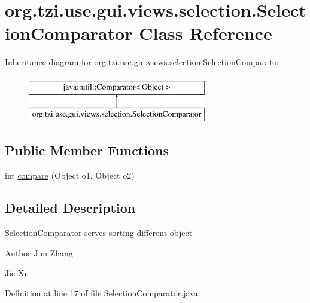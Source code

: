 \hypertarget{classorg_1_1tzi_1_1use_1_1gui_1_1views_1_1selection_1_1_selection_comparator}{\section{org.\-tzi.\-use.\-gui.\-views.\-selection.\-Selection\-Comparator Class Reference}
\label{classorg_1_1tzi_1_1use_1_1gui_1_1views_1_1selection_1_1_selection_comparator}
}
Inheritance diagram for org.\-tzi.\-use.\-gui.\-views.\-selection.\-Selection\-Comparator\-:\begin{figure}[H]
\begin{center}
\leavevmode
\includegraphics[height=2.000000cm]{classorg_1_1tzi_1_1use_1_1gui_1_1views_1_1selection_1_1_selection_comparator}
\end{center}
\end{figure}
\subsection*{Public Member Functions}
\begin{DoxyCompactItemize}
\item 
int \hyperlink{classorg_1_1tzi_1_1use_1_1gui_1_1views_1_1selection_1_1_selection_comparator_ae861cc638bd95613b9477306586fb704}{compare} (Object o1, Object o2)
\end{DoxyCompactItemize}


\subsection{Detailed Description}
\hyperlink{classorg_1_1tzi_1_1use_1_1gui_1_1views_1_1selection_1_1_selection_comparator}{Selection\-Comparator} serves sorting different object

\begin{DoxyAuthor}{Author}
Jun Zhang 

Jie Xu 
\end{DoxyAuthor}


Definition at line 17 of file Selection\-Comparator.\-java.



